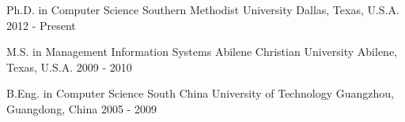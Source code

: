 

\begin{cventries}

  \cventry
  {Ph.D. in Computer Science} %
  {Southern Methodist University} %
  {Dallas, Texas, U.S.A.} %
  {2012 - Present} %
  {}

  \cventry
  {M.S. in Management Information Systems} %
  {Abilene Christian University} %
  {Abilene, Texas, U.S.A.} %
  {2009 - 2010} %
  {}

  \cventry
  {B.Eng. in Computer Science} %
  {South China University of Technology} %
  {Guangzhou, Guangdong, China} %
  {2005 - 2009} %
  {}

\end{cventries}
